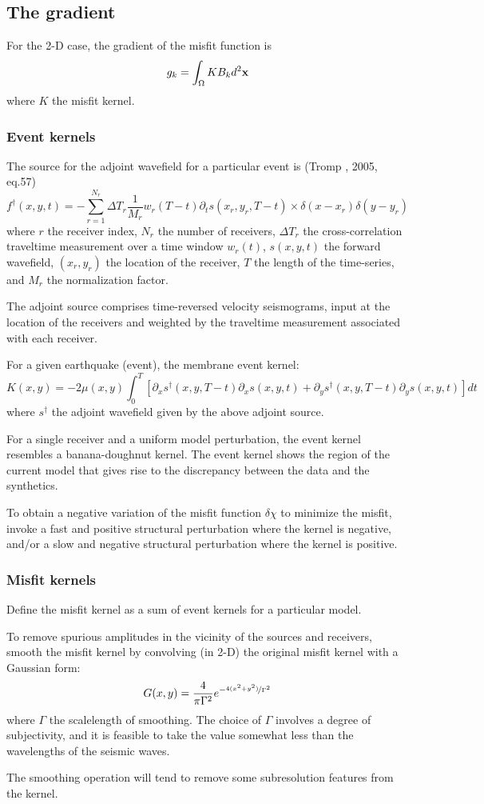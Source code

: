 \subsection{The gradient}
For the 2-D case, the gradient of the misfit function is
\[ g_k=\int_\Omega KB_kd^2\mathbf{x} \]
where $K$ the misfit kernel.\par
\subsubsection{Event kernels}
The source for the adjoint wavefield for a particular event is (Tromp \etal, 2005, eq.57)
\[ f^\dagger(x,y,t)=-\sum_{r=1}^{N_r}\Delta T_r\frac{1}{M_r}w_r(T-t)\partial_ts(x_r,y_r,T-t)\times\delta(x-x_r)\delta(y-y_r) \]
where $r$ the receiver index, $N_r$ the number of receivers, $\Delta T_r$ the cross-correlation traveltime measurement over a time window $w_r(t)$, $s(x,y,t)$ the forward wavefield, $(x_r,y_r)$ the location of the receiver, $T$ the length of the time-series, and $M_r$ the normalization factor.\par
The adjoint source comprises time-reversed velocity seismograms, input at the location of the receivers and weighted by the traveltime measurement associated with each receiver.\par
For a given earthquake (event), the membrane event kernel:
\[ K(x,y)=-2\mu(x,y)\int_0^T[\partial_xs^\dagger(x,y,T-t)\partial_xs(x,y,t)+\partial_ys^\dagger(x,y,T-t)\partial_ys(x,y,t)]dt \]
where $s^\dagger$ the adjoint wavefield given by the above adjoint source.\par
For a single receiver and a uniform model perturbation, the event kernel resembles a banana-doughnut kernel. The event kernel shows the region of the current model that gives rise to the discrepancy between the data and the synthetics.\par
To obtain a negative variation of the misfit function $\delta\chi$ to minimize the misfit, invoke a fast and positive structural perturbation where the kernel is negative, and/or a slow and negative structural perturbation where the kernel is positive.\par
\subsubsection{Misfit kernels}
Define the misfit kernel as a sum of event kernels for a particular model.\par
To remove spurious amplitudes in the vicinity of the sources and receivers, smooth the misfit kernel by convolving (in 2-D) the original misfit kernel with a Gaussian form:
\[ G(x,y)=\frac{4}{\pi\Gamma^2}e^{-\nicefrac{4(x^2+y^2)}{\Gamma^2}} \]
where $\Gamma$ the scalelength of smoothing. The choice of $\Gamma$ involves a degree of subjectivity, and it is feasible to take the value somewhat less than the wavelengths of the seismic waves.\par
The smoothing operation will tend to remove some subresolution features from the kernel.\par
